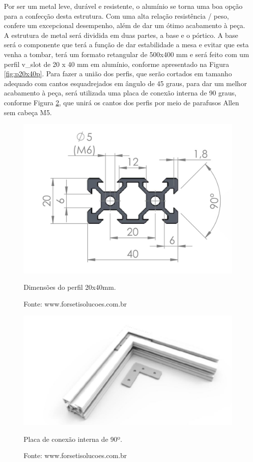 Por ser um metal leve, durável e resistente, o alumínio se torna uma boa opção para a confecção desta 
estrutura. Com uma alta relação resistência / peso, confere um excepcional desempenho, além de dar um ótimo 
acabamento à peça. A estrutura de metal será dividida em duas partes, a base e o pórtico. A base será 
o componente que terá a função de dar estabilidade a mesa e evitar que esta venha  a tombar, terá um 
formato retangular de 500x400 mm e será feito com um perfil v\_slot de 20 x 40 mm em alumínio, conforme 
apresentado na Figura \ref{fig:p20x40p}. 
Para fazer a união dos perfis, que serão cortados em tamanho adequado com cantos esquadrejados em 
ângulo de 45 graus, para dar um melhor acabamento à peça, será utilizada uma placa de conexão 
interna de 90 graus, conforme Figura \ref{fig:pconexao90p}, que unirá os cantos dos perfis por 
meio de parafusos Allen sem cabeça M5.

    
\begin{figure}[!htb]
\centering
\includegraphics[scale = 0.4]{figuras/3-2}
\caption{Dimensões do perfil 20x40mm.}
\caption*{Fonte: www.forsetisolucoes.com.br}
\label{fig:p20x40d}
\end{figure}
    
\begin{figure}[!htb]
\centering
\includegraphics[scale = 0.4]{figuras/3-3}
\caption{Placa de conexão interna de 90º.}
\caption*{Fonte: www.forsetisolucoes.com.br}
\label{fig:pconexao90p}
\end{figure}
    
